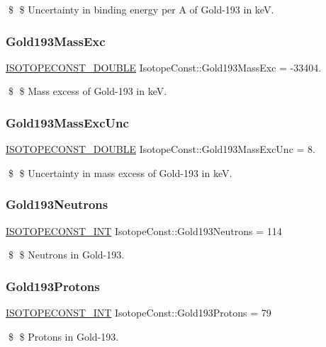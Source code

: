 \$ \$ Uncertainty in binding energy per A of Gold-\/193 in keV. \mbox{\label{group___isotope_const-_gold-_au193_ga1ed1691c25adc4d227cf020d063a64f4}} 
\subsubsection{\texorpdfstring{Gold193\+Mass\+Exc}{Gold193MassExc}}
{\footnotesize\ttfamily \mbox{\hyperlink{group___isotope_const-_macros_ga8f45a7272ce02c0b4c65c44636ed719a}{I\+S\+O\+T\+O\+P\+E\+C\+O\+N\+S\+T\+\_\+\+D\+O\+U\+B\+LE}} Isotope\+Const\+::\+Gold193\+Mass\+Exc = -\/33404.}

\$ \$ Mass excess of Gold-\/193 in keV. \mbox{\label{group___isotope_const-_gold-_au193_gab938bd10eb0ed749f316bc9cb57249c6}} 
\subsubsection{\texorpdfstring{Gold193\+Mass\+Exc\+Unc}{Gold193MassExcUnc}}
{\footnotesize\ttfamily \mbox{\hyperlink{group___isotope_const-_macros_ga8f45a7272ce02c0b4c65c44636ed719a}{I\+S\+O\+T\+O\+P\+E\+C\+O\+N\+S\+T\+\_\+\+D\+O\+U\+B\+LE}} Isotope\+Const\+::\+Gold193\+Mass\+Exc\+Unc = 8.}

\$ \$ Uncertainty in mass excess of Gold-\/193 in keV. \mbox{\label{group___isotope_const-_gold-_au193_gafc6fdbee56c0363b1570e51fbf160961}} 
\subsubsection{\texorpdfstring{Gold193\+Neutrons}{Gold193Neutrons}}
{\footnotesize\ttfamily \mbox{\hyperlink{group___isotope_const-_macros_ga5f18360b3e99483a35c32d789e62621c}{I\+S\+O\+T\+O\+P\+E\+C\+O\+N\+S\+T\+\_\+\+I\+NT}} Isotope\+Const\+::\+Gold193\+Neutrons = 114}

\$ \$ Neutrons in Gold-\/193. \mbox{\label{group___isotope_const-_gold-_au193_ga8455d940a466704d358e8f441dc4feff}} 
\subsubsection{\texorpdfstring{Gold193\+Protons}{Gold193Protons}}
{\footnotesize\ttfamily \mbox{\hyperlink{group___isotope_const-_macros_ga5f18360b3e99483a35c32d789e62621c}{I\+S\+O\+T\+O\+P\+E\+C\+O\+N\+S\+T\+\_\+\+I\+NT}} Isotope\+Const\+::\+Gold193\+Protons = 79}

\$ \$ Protons in Gold-\/193. 